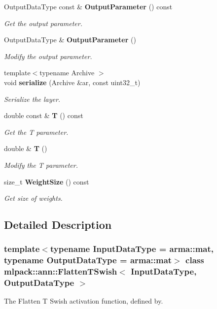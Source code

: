 \begin{DoxyCompactItemize}
Output\+Data\+Type const  \& \textbf{ Output\+Parameter} () const
\begin{DoxyCompactList}\small\item\em Get the output parameter. \end{DoxyCompactList}\item 
Output\+Data\+Type \& \textbf{ Output\+Parameter} ()
\begin{DoxyCompactList}\small\item\em Modify the output parameter. \end{DoxyCompactList}\item 
{\footnotesize template$<$typename Archive $>$ }\\void \textbf{ serialize} (Archive \&ar, const uint32\+\_\+t)
\begin{DoxyCompactList}\small\item\em Serialize the layer. \end{DoxyCompactList}\item 
double const  \& \textbf{ T} () const
\begin{DoxyCompactList}\small\item\em Get the T parameter. \end{DoxyCompactList}\item 
double \& \textbf{ T} ()
\begin{DoxyCompactList}\small\item\em Modify the T parameter. \end{DoxyCompactList}\item 
size\+\_\+t \textbf{ Weight\+Size} () const
\begin{DoxyCompactList}\small\item\em Get size of weights. \end{DoxyCompactList}\end{DoxyCompactItemize}


\subsection{Detailed Description}
\subsubsection*{template$<$typename Input\+Data\+Type = arma\+::mat, typename Output\+Data\+Type = arma\+::mat$>$\newline
class mlpack\+::ann\+::\+Flatten\+T\+Swish$<$ Input\+Data\+Type, Output\+Data\+Type $>$}

The Flatten T Swish activation function, defined by. 

